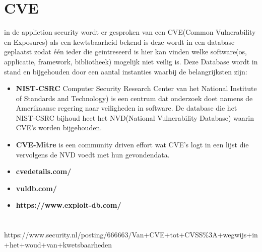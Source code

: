 \section{CVE}
in de appliction security wordt er gesproken van een CVE(Common Vulnerability en Exposures) als een kewtsbaarheid bekend is deze wordt in een database geplaatst zodat \'e\'en ieder die geintreseerd is hier kan vinden welke software(os, applicatie, framework, bibliotheek) mogelijk niet veilig is. Deze Database wordt in stand en bijgehouden door een aantal instanties waarbij de belangrijksten zijn:
\begin{itemize}
    \item \textbf{NIST-CSRC} Computer Security Research Center van het National Institute of Standards and Technology) is een centrum dat onderzoek doet namens de Amerikaanse regering naar veiligheden in software. De database die het NIST-CSRC bijhoud heet het NVD(National Vulnerability Database) waarin CVE's worden bijgehouden.
    \item \textbf{CVE-Mitre} is een community driven effort wat CVE's logt in een lijst die vervolgens de NVD voedt met hun gevondendata.
    \item \textbf{cvedetails.com/}
    \item \textbf{vuldb.com/}
    \item \textbf{https://www.exploit-db.com/}
\end{itemize}

\section{}

https://www.security.nl/posting/666663/Van+CVE+tot+CVSS\%3A+wegwijs+in+het+woud+van+kwetsbaarheden










